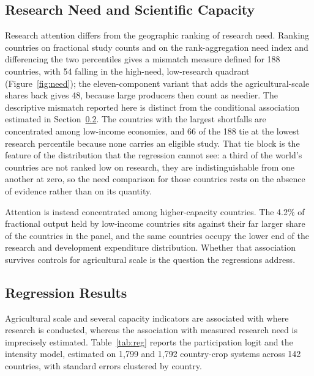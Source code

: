 \documentclass[ASNA,twocolumn]{USG}
\begin{document}
\subsection{Research Need and Scientific Capacity}

Research attention differs from the geographic ranking of research need.
Ranking countries on fractional study counts and on the rank-aggregation need index and
differencing the two percentiles gives a mismatch measure defined for 188 countries, with 54
falling in the high-need, low-research quadrant (Figure~\ref{fig:need}); the eleven-component
variant that adds the agricultural-scale shares back gives 48, because large producers then count
as needier. The descriptive mismatch reported here is distinct from the conditional association
estimated in Section~\ref{sec:reg}. The countries with the largest shortfalls are concentrated
among low-income economies, and 66 of the 188 tie at the lowest research percentile because none
carries an eligible study. That tie block is the feature of the distribution that the regression
cannot see: a third of the world's countries are not ranked low on research, they are
indistinguishable from one another at zero, so the need comparison for those countries rests on
the absence of evidence rather than on its quantity.

Attention is instead concentrated among higher-capacity countries. The 4.2\% of fractional
output held by low-income countries sits against their far larger share of the countries in
the panel, and the same countries occupy the lower end of the research and development
expenditure distribution. Whether that association survives controls for agricultural scale is
the question the regressions address.

\subsection{Regression Results}\label{sec:reg}

Agricultural scale and several capacity indicators are associated with where research is
conducted, whereas the association with measured research need is imprecisely estimated.
Table~\ref{tab:reg} reports the participation logit and the intensity model, estimated on
1,799 and 1,792 country-crop systems across 142 countries, with standard errors clustered by
country.
\end{document}
